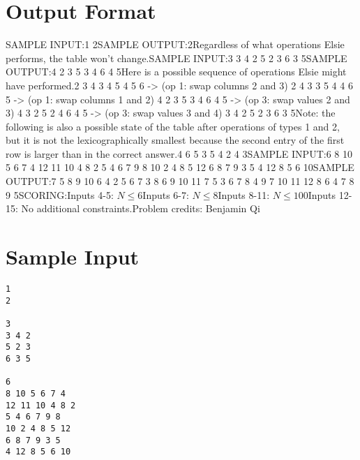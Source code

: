 \documentclass[12pt]{article}
\begin{document}
\section*{Output Format}
SAMPLE INPUT:1
2SAMPLE OUTPUT:2Regardless of what operations Elsie performs, the table won't change.SAMPLE INPUT:3
3 4 2
5 2 3
6 3 5SAMPLE OUTPUT:4 2 3
5 3 4
6 4 5Here is a possible sequence of operations Elsie might have performed.2 3 4
3 4 5
4 5 6
-> (op 1: swap columns 2 and 3)
2 4 3
3 5 4
4 6 5
-> (op 1: swap columns 1 and 2)
4 2 3
5 3 4
6 4 5
-> (op 3: swap values 2 and 3)
4 3 2
5 2 4
6 4 5
-> (op 3: swap values 3 and 4)
3 4 2
5 2 3
6 3 5Note: the following is also a possible state of the table after operations of
types 1 and 2, but it is not the lexicographically smallest because the second
entry of the first row is larger than in the correct answer.4 6 5
3 5 4
2 4 3SAMPLE INPUT:6
8 10 5 6 7 4
12 11 10 4 8 2
5 4 6 7 9 8
10 2 4 8 5 12
6 8 7 9 3 5
4 12 8 5 6 10SAMPLE OUTPUT:7 5 8 9 10 6
4 2 5 6 7 3
8 6 9 10 11 7
5 3 6 7 8 4
9 7 10 11 12 8
6 4 7 8 9 5SCORING:Inputs 4-5: $N\le 6$Inputs 6-7: $N\le 8$Inputs 8-11: $N\le 100$Inputs 12-15: No additional constraints.Problem credits: Benjamin Qi

\section*{Sample Input}
\begin{verbatim}
1
2

3
3 4 2
5 2 3
6 3 5

6
8 10 5 6 7 4
12 11 10 4 8 2
5 4 6 7 9 8
10 2 4 8 5 12
6 8 7 9 3 5
4 12 8 5 6 10
\end{verbatim}
\end{document}
